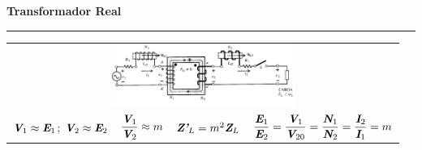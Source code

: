 \documentclass[11pt,a4paper]{article}
\newcommand{\fasor}[1]{\uppercase{\textit{\textbf{#1}}}}
\newcommand{\subtitulo}[1]{
    \textbf{#1} \\ \vspace{.1cm} {\color{gray} \hrule}
}
\begin{document}
\begin{cajita}
        \begin{center}
            \subtitulo{Transformador Real}
        \end{center}
        \begin{tabular}{r |c | c | l}
            \multicolumn{4}{c}{\includegraphics[width = 6cm]{trafo-real}} \\
            $\fasor{V}_{1}\approx\fasor{E}_{1}$; $\fasor{V}_{2}\approx\fasor{E}_{2}$ &
            $\dfrac{\fasor{V}_{1}}{\fasor{V}_{2}}\approx m$ &
            $\fasor{Z'}_{L}= m^{2} \fasor{Z}_{L}$&
            $\dfrac{\fasor{E}_{1}}{\fasor{E}_{2}}=\dfrac{\fasor{V}_{1}}{\fasor{V}_{20}}=\dfrac{\fasor{N}_{1}}{\fasor{N}_{2}}=\dfrac{\fasor{I}_{2}}{\fasor{I}_{1}}=m$\\
        \end{tabular}

    \end{cajita}
\newpage
\end{document}
